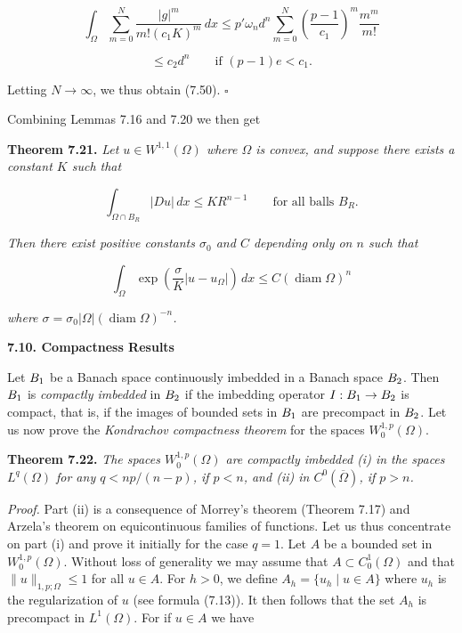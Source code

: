 \[
\int_{\Omega}\sum_{m=0}^{N}\frac{|g|^m}{m!(c_1K)^m}\,dx
\leq p'\omega_n d^n \sum_{m=0}^{N}\left(\frac{p-1}{c_1}\right)^m \frac{m^m}{m!}
\]

\[
\leq c_2 d^n \qquad \text{if } (p-1)e < c_1.
\]

Letting $N \to \infty$, we thus obtain (7.50). $\square$

Combining Lemmas 7.16 and 7.20 we then get

\textbf{Theorem 7.21.} \emph{Let $u \in W^{1,1}(\Omega)$ where $\Omega$ is convex, and suppose there exists a constant $K$ such that}

\begin{equation}
\tag{7.51}
\int_{\Omega \cap B_R} |Du|\,dx \leq K R^{n-1} \qquad \text{for all balls } B_R.
\end{equation}

\emph{Then there exist positive constants $\sigma_0$ and $C$ depending only on $n$ such that}

\begin{equation}
\tag{7.52}
\int_{\Omega} \exp\!\left(\frac{\sigma}{K}|u-u_{\Omega}|\right)\,dx \leq C(\operatorname{diam}\Omega)^n
\end{equation}

\emph{where $\sigma = \sigma_0 |\Omega|(\operatorname{diam}\Omega)^{-n}$.}


\textbf{7.10. Compactness Results}

Let $B_1$ be a Banach space continuously imbedded in a Banach space $B_2$. Then
$B_1$ is \emph{compactly imbedded} in $B_2$ if the imbedding operator $I:B_1 \to B_2$ is compact,
that is, if the images of bounded sets in $B_1$ are precompact in $B_2$. Let us now prove
the \emph{Kondrachov compactness theorem} for the spaces $W^{1,p}_0(\Omega)$.

\medskip

\textbf{Theorem 7.22.} \emph{The spaces $W^{1,p}_0(\Omega)$ are compactly imbedded (i) in the spaces $L^q(\Omega)$
for any $q<np/(n-p)$, if $p<n$, and (ii) in $C^0(\overline{\Omega})$, if $p>n$.}

\medskip

\textit{Proof.} Part (ii) is a consequence of Morrey's theorem (Theorem 7.17) and
Arzela's theorem on equicontinuous families of functions. Let us thus concentrate
on part (i) and prove it initially for the case $q=1$. Let $A$ be a bounded set in $W^{1,p}_0(\Omega)$.
Without loss of generality we may assume that $A \subset C^1_0(\Omega)$ and that $\|u\|_{1,p;\Omega} \le 1$
for all $u \in A$. For $h>0$, we define $A_h=\{u_h \mid u \in A\}$ where $u_h$ is the regularization
of $u$ (see formula (7.13)). It then follows that the set $A_h$ is precompact in $L^1(\Omega)$.
For if $u \in A$ we have


